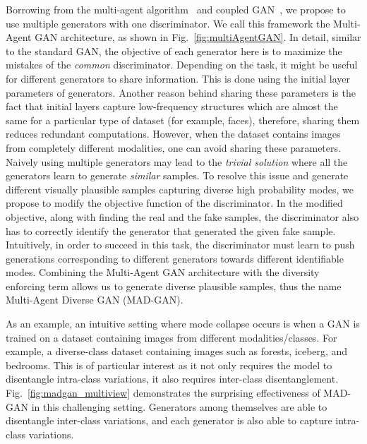 Borrowing from the multi-agent algorithm~\cite{abadi2016learning} and coupled GAN~\cite{liu2016coupled}, we propose to use multiple generators with one discriminator. We call this framework the Multi-Agent GAN architecture, as shown in Fig.~\ref{fig:multiAgentGAN}. In detail, similar to the standard GAN, the objective of each generator here is to maximize the mistakes of the {\em common} discriminator. Depending on the task, it might be useful for different generators to share information. This is done using the initial layer parameters of generators. Another reason behind sharing these parameters is the fact that initial layers capture low-frequency structures which are almost the same for a particular type of dataset (for example, faces), therefore, sharing them reduces redundant computations. However, when the dataset contains images from completely different modalities, one can avoid sharing these parameters. Naively using multiple generators may lead to the {\em trivial solution} where all the generators learn to generate {\em similar} samples. To resolve this issue and generate different visually plausible samples capturing diverse high probability modes, we propose to modify the objective function of the discriminator. In the modified objective, along with finding the real and the fake samples, the discriminator also has to correctly identify the generator that generated the given fake sample. Intuitively, in order to succeed in this task, the discriminator must learn to push generations corresponding to different generators towards different identifiable modes. Combining the Multi-Agent GAN architecture with the diversity enforcing term allows us to generate diverse plausible samples, thus the name Multi-Agent Diverse GAN (MAD-GAN).  


As an example, an intuitive setting where mode collapse occurs is when a GAN is trained on a dataset containing images from different modalities/classes. For example, a diverse-class dataset containing images such as forests, iceberg, and bedrooms. This is of particular interest as it not only requires the model to disentangle intra-class variations, it also requires inter-class disentanglement. Fig.~\ref{fig:madgan_multiview} demonstrates the surprising effectiveness of MAD-GAN in this challenging setting. Generators among themselves are able to disentangle inter-class variations, and each generator is also able to capture intra-class variations.

